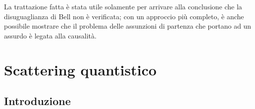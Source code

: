 \documentclass[11pt, a4paper]{scrartcl} %
\numberwithin{equation}{subsection}
\theoremstyle{style2}
\theoremstyle{style1}
\begin{document}
La trattazione fatta \`e stata utile solamente per arrivare alla conclusione che la disuguaglianza di Bell non \`e verificata; con un approccio pi\`u completo, \`e anche possibile mostrare che il problema delle assunzioni di partenza che portano ad un assurdo \`e legata alla causalit\`a.
















\newpage

\section{Scattering quantistico}
\subsection{Introduzione}
\end{document}
